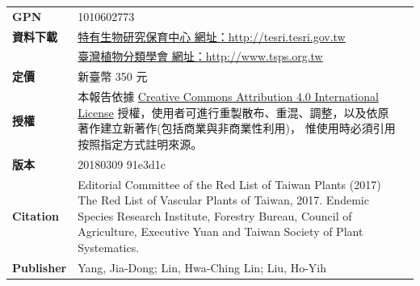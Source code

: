 \begin{table}[H]
{\begin{tabular}{>{\raggedleft\arraybackslash}p{2.5cm}p{9cm}p{3cm}}
      \textbf{GPN}               & 1010602773  & \\
      \textbf{資料下載}          & \href{http://tesri.tesri.gov.tw}{特有生物研究保育中心 網址：http://tesri.tesri.gov.tw}  & \\
                                 & \href{http://www.tsps.org.tw}{臺灣植物分類學會 網址：http://www.tsps.org.tw}  & \\
      \textbf{定價}              & 新臺幣 350 元  & \\
      \textbf{授權}              & 本報告依據
                                   \href{https://creativecommons.org/licenses/by/4.0}{Creative Commons Attribution 4.0 International License}
                                   授權，使用者可進行重製散布、重混、調整，以及依原著作建立新著作(包括商業與非商業性利用)，
                                   惟使用時必須引用按照指定方式註明來源。  & \\
      \textbf{版本}              & 20180309 91e3d1c \\
      \textbf{Citation}          & Editorial Committee of the Red List of Taiwan Plants (2017) The Red List of Vascular Plants of Taiwan, 2017.
                                   Endemic Species Research Institute, Forestry Bureau, Council of Agriculture, 
                                   Executive Yuan and Taiwan Society of Plant Systematics.  & \\
      \textbf{Publisher}         & Yang, Jia-Dong; Lin, Hwa-Ching Lin; Liu, Ho-Yih  & 
\end{tabular}}
\end{table}

